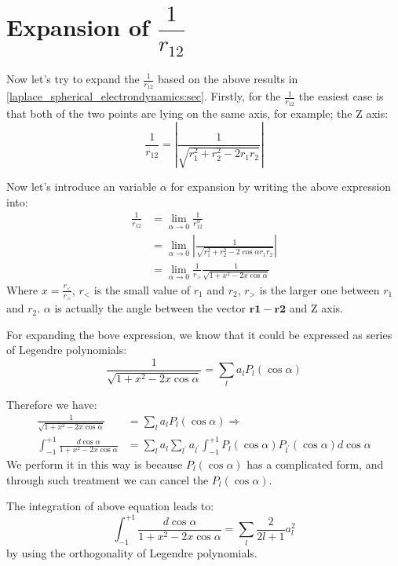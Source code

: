 \section{Expansion of $\dfrac{1}{r_{12}}$}
\label{r12_electrondynamics:sec}
%
%
%
Now let's try to expand the $\frac{1}{r_{12}}$ based on the above 
results in \ref{laplace_spherical_electrondynamics:sec}. Firstly,
for the $\frac{1}{r_{12}}$ the easiest case is that both of the two
points are lying on the same axis, for example; the Z axis:
\begin{equation}\label{}
\frac{1}{r_{12}} = \left| \frac{1}{\sqrt{r_{1}^{2}+r_{2}^{2}-2r_{1}r_{2}}}\right|
\end{equation}

Now let's introduce an variable $\alpha$ for expansion by writing the above 
expression into:
\begin{align}\label{r12_electrondynamics:0}
\frac{1}{r_{12}} &= \lim_{\alpha\rightarrow 0} \frac{1}{r_{12}^{\alpha}} \nonumber \\
&=\lim_{\alpha\rightarrow 0}
\left| \frac{1}{\sqrt{r_{1}^{2}+r_{2}^{2}-2\cos \alpha r_{1}r_{2}}}\right| \nonumber \\
&= \lim_{\alpha\rightarrow 0}\frac{1}{r_{>}} \frac{1}{\sqrt{1+x^{2}-2x\cos \alpha }}
\end{align}
Where $x = \frac{r_{<}}{r_{>}}$, $r_{<}$ is the small value of $r_{1}$ and $r_{2}$,
$r_{>}$ is the larger one between $r_{1}$ and $r_{2}$. $\alpha$ is actually the 
angle between the vector $\bm{r1-r2}$ and Z axis.

For expanding the bove expression, we know that it could be expressed as series 
of Legendre polynomials:
\begin{equation}
 \frac{1}{\sqrt{1+x^{2}-2x\cos \alpha }} = 
 \sum_{l}a_{l}P_{l}(\cos \alpha) 
\end{equation}

Therefore we have:
\begin{align}
\frac{1}{\sqrt{1+x^{2}-2x\cos \alpha }} &= 
 \sum_{l}a_{l}P_{l}(\cos \alpha) \Rightarrow \nonumber \\
\int_{-1}^{+1}\frac{d \cos \alpha}{1+x^{2}-2x\cos \alpha} &= 
\sum_{l}a_{l}\sum_{l^{'}}a_{l^{'}}
\int^{+1}_{-1} P_{l}(\cos \alpha)P_{l^{'}}(\cos \alpha) d \cos \alpha
\end{align}
We perform it in this way is because $P_{l}(\cos \alpha)$ has a
complicated form, and through such treatment we can cancel
the $P_{l}(\cos \alpha)$.

The integration of above equation leads to:
\begin{equation}\label{r12_electrondynamics:1}
\int_{-1}^{+1}\frac{d \cos \alpha}{1+x^{2}-2x\cos \alpha} = 
\sum_{l}\frac{2}{2l+1}a_{l}^{2} 
\end{equation}
by using the orthogonality of Legendre polynomials.

